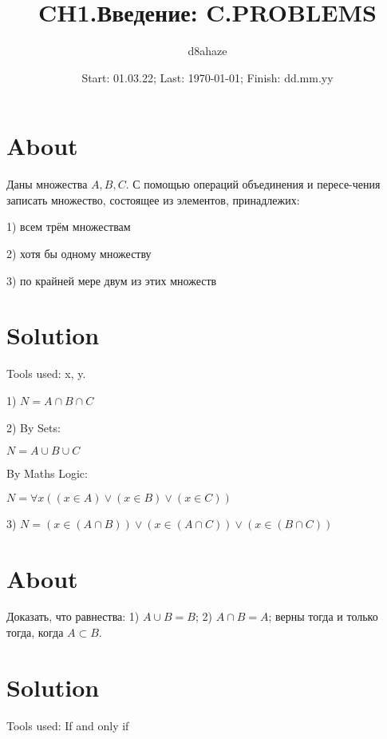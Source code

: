 \documentclass{spaceC}
\author{d8ahaze}
\date{Start: 01.03.22; Last: \today; Finish: dd.mm.yy}
\title{CH1.Введение: C.PROBLEMS} %
\begin{document}
 \maketitle

\csec

\section{About} Даны множества $A, B, C$. С помощью операций объединения и пересе-чения записать множество, состоящее из элементов, принадлежих:

1) всем трём множествам

2) хотя бы одному множеству

3) по крайней мере двум из этих множеств

\section{Solution}
Tools used: x, y.

1) $N = A \cap B \cap C$

2) By Sets:

$N = A \cup B \cup C$

By Maths Logic:

$N = \forall x((x \in A) \lor (x \in B) \lor (x \in C))$

3) $N = (x \in (A \cap B)) \lor (x \in (A \cap C)) \lor (x \in (B \cap C))$

\vspace{5mm}
\csec
\section{About}\label{STPssuis}

Доказать, что равнества: 1) $A \cup B = B$; 2) $A \cap B = A$; верны тогда и только тогда, когда $A \subset B$.

\section{Solution}
Tools used: If and only if
\end{document}
